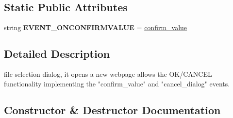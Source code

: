 \subsection*{Static Public Attributes}
\begin{DoxyCompactItemize}
\item 
string {\bfseries E\+V\+E\+N\+T\+\_\+\+O\+N\+C\+O\+N\+F\+I\+R\+M\+V\+A\+L\+UE} = \textquotesingle{}\hyperlink{classremi_1_1gui_1_1FileSelectionDialog_a23dd582a965317b649046e5e6a765a1a}{confirm\+\_\+value}\textquotesingle{}\hypertarget{classremi_1_1gui_1_1FileSelectionDialog_a2bae90f12d62adda26d53eafecb9908f}{}\label{classremi_1_1gui_1_1FileSelectionDialog_a2bae90f12d62adda26d53eafecb9908f}

\end{DoxyCompactItemize}


\subsection{Detailed Description}
\begin{DoxyVerb}file selection dialog, it opens a new webpage allows the OK/CANCEL functionality
implementing the "confirm_value" and "cancel_dialog" events.\end{DoxyVerb}
 

\subsection{Constructor \& Destructor Documentation}
